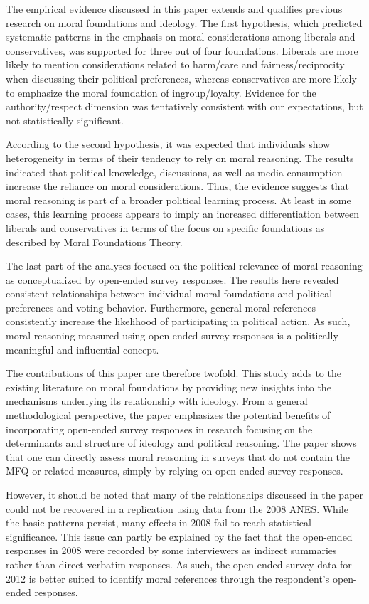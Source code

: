 \documentclass[12pt]{article}
\begin{document}
The empirical evidence discussed in this paper extends and qualifies previous research on moral foundations and ideology. The first hypothesis, which predicted systematic patterns in the emphasis on moral considerations among liberals and conservatives, was supported for three out of four foundations. Liberals are more likely to mention considerations related to harm/care and fairness/reciprocity when discussing their political preferences, whereas conservatives are more likely to emphasize the moral foundation of ingroup/loyalty. Evidence for the authority/respect dimension was tentatively consistent with our expectations, but not statistically significant.

According to the second hypothesis, it was expected that individuals show heterogeneity in terms of their tendency to rely on moral reasoning. The results indicated that political knowledge, discussions, as well as media consumption increase the reliance on moral considerations. Thus, the evidence suggests that moral reasoning is part of a broader political learning process. At least in some cases, this learning process appears to imply an increased differentiation between liberals and conservatives in terms of the focus on specific foundations as described by Moral Foundations Theory.

The last part of the analyses focused on the political relevance of moral reasoning as conceptualized by open-ended survey responses. The results here revealed consistent relationships between individual moral foundations and political preferences and voting behavior. Furthermore, general moral references consistently increase the likelihood of participating in political action. As such, moral reasoning measured using open-ended survey responses is a politically meaningful and influential concept.

The contributions of this paper are therefore twofold. This study adds to the existing literature on moral foundations by providing new insights into the mechanisms underlying its relationship with ideology. From a general methodological perspective, the paper emphasizes the potential benefits of incorporating open-ended survey responses in research focusing on the determinants and structure of ideology and political reasoning. The paper shows that one can directly assess moral reasoning in surveys that do not contain the MFQ or related measures, simply by relying on open-ended survey responses.

However, it should be noted that many of the relationships discussed in the paper could not be recovered in a replication using data from the 2008 ANES. While the basic patterns persist, many effects in 2008 fail to reach statistical significance. This issue can partly be explained by the fact that the open-ended responses in 2008 were recorded by some interviewers as indirect summaries rather than direct verbatim responses. As such, the open-ended survey data for 2012 is better suited to identify moral references through the respondent's open-ended responses.
\end{document}
